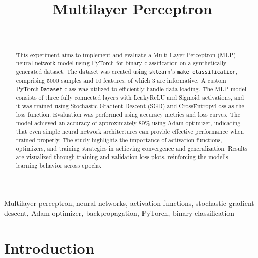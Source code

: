 \documentclass[a4paper, journal]{IEEEtran}
\begin{document}
\title{Multilayer Perceptron}
\author{
     \\
    }

\maketitle

\begin{abstract}
    This experiment aims to implement and evaluate a Multi-Layer Perceptron (MLP) neural network model using PyTorch for binary classification on a synthetically generated dataset. The dataset was created using \texttt{sklearn}'s \texttt{make\_classification}, comprising 5000 samples and 10 features, of which 3 are informative. A custom PyTorch \texttt{Dataset} class was utilized to efficiently handle data loading. The MLP model consists of three fully connected layers with LeakyReLU and Sigmoid activations, and it was trained using Stochastic Gradient Descent (SGD) and CrossEntropyLoss as the loss function. Evaluation was performed using accuracy metrics and loss curves. The model achieved an accuracy of approximately 89\% using Adam optimizer, indicating that even simple neural network architectures can provide effective performance when trained properly. The study highlights the importance of activation functions, optimizers, and training strategies in achieving convergence and generalization. Results are visualized through training and validation loss plots, reinforcing the model's learning behavior across epochs.
\end{abstract}

\begin{IEEEkeywords}
    Multilayer perceptron, neural networks, activation functions, stochastic gradient descent, Adam optimizer, backpropagation, PyTorch, binary classification
\end{IEEEkeywords}

\section{Introduction}
\end{document}
